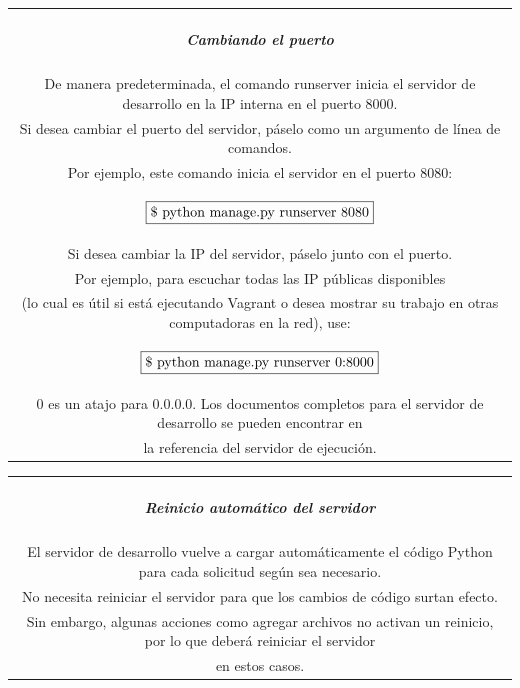 \documentclass[10pt]{article}
\newcommand{\py}[1]{{\textcolor{B}{Python} #1}}
\begin{document}
\begin{table}[H]
	\begin{tabular}{||c||}
	\hline \\
	\begin{Large}
	\textbf{\textit{Cambiando el puerto}}
	\end{Large}
	\\\\
			De manera predeterminada, el comando runserver inicia el servidor de desarrollo en la IP interna en el puerto 8000.\\
Si desea cambiar el puerto del servidor, páselo como un argumento de línea de comandos.\\Por ejemplo, este comando inicia el servidor en el puerto 8080:
\\\\
$$\fbox{\$ python manage.py runserver 8080}$$
\\\\
Si desea cambiar la IP del servidor, páselo junto con el puerto.\\ Por ejemplo, para escuchar todas las IP públicas disponibles\\ (lo cual es útil si está ejecutando Vagrant o desea mostrar su trabajo en otras computadoras en la red), use:
\\\\$$\fbox{\$ python manage.py runserver 0:8000}$$
\\\\

0 es un atajo para 0.0.0.0. Los documentos completos para el servidor de desarrollo se pueden encontrar en \\la referencia del servidor de ejecución.
	\\ \hline 	
			\end{tabular}
		\end{table}		
		
\begin{table}[H]
	\begin{tabular}{||c||}
	\hline \\
	\begin{Large}
	\textbf{\textit{Reinicio automático del servidor}}
	\end{Large}
	\\\\		
El servidor de desarrollo vuelve a cargar automáticamente el código \py{} para cada solicitud según sea necesario.\\ No necesita reiniciar el servidor para que los cambios de código surtan efecto.\\ Sin embargo, algunas acciones como agregar archivos no activan un reinicio, por lo que deberá reiniciar el servidor \\en estos casos.
\\ \hline 	
			\end{tabular}
		\end{table}		
\end{document}
